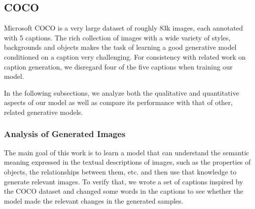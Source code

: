 \documentclass{article} %
\begin{document}


\subsection{COCO}

Microsoft COCO \citep{mscoco} is a very large dataset of roughly 83k images, each annotated with 5 captions. The rich collection of images with a wide variety of styles, backgrounds and objects makes the task of learning a good generative model conditioned on a caption very challenging. For consistency with related work on caption generation, we disregard four of the five captions when training our model.

In the following subsections, we analyze both the qualitative and quantitative aspects of our model as well as compare its performance with that of other, related generative models.

\subsubsection{Analysis of Generated Images}
The main goal of this work is to learn a model that can understand the semantic meaning expressed in the textual descriptions of images, such as the properties of objects, the relationships between them, etc. and then use that knowledge to generate relevant images. To verify that, we wrote a set of captions inspired by the COCO dataset and changed some words in the captions to see whether the model made the relevant changes in the generated samples.
\end{document}
